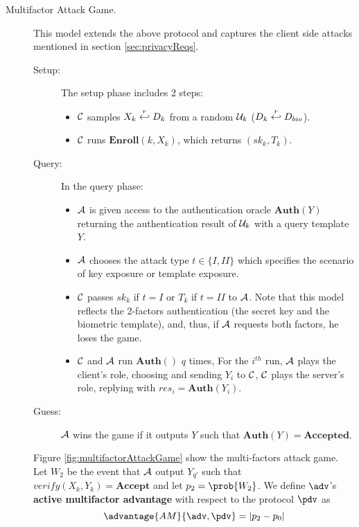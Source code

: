\begin{description}
\begin{description}
  \item[Multifactor Attack Game.] This model extends the above protocol and
    captures the client side attacks mentioned in section \ref{sec:privacyReqs}.
    \begin{description}
    \item[Setup:] The setup phase includes 2 steps:
      \begin{itemize}
      \item $\mathcal{C}$ samples $X_k \stackrel{r}{\hookleftarrow} D_{k}$ from a random
        $\mathcal{U}_k$ ($D_k \stackrel{r}{\hookleftarrow} D_{bio}$).
      \item $\mathcal{C}$ runs $\textbf{Enroll}(k, X_k)$, which returns $(sk_k, T_k)$.
      \end{itemize}
    \item[Query:] In the query phase:
      \begin{itemize}
      \item $\mathcal{A}$ is given access to the authentication oracle
        $\mathbf{Auth}(Y)$ returning the authentication result of $\mathcal{U}_k$ with
        a query template $Y$.
      \item $\mathcal{A}$ chooses the attack type $t \in \{I,II\}$ which specifies
        the scenario of key exposure or template exposure.

      \item $\mathcal{C}$ passes $sk_k$ if $t = I$ or $T_k$ if $t = II$ to
        $\mathcal{A}$. Note that this model reflects the 2-factors authentication
        (the secret key and the biometric template), and, thus, if $\mathcal{A}$
        requests both factors, he loses the game.
      \item $\mathcal{C}$ and $\mathcal{A}$ run $\mathbf{Auth()}$ $q$ times, For
        the $i^{th}$ run, $\mathcal{A}$ plays the client's role, choosing and
        sending $Y_i$ to $\mathcal{C}$, $\mathcal{C}$ plays the server's role,
        replying with $res_i = \mathbf{Auth}(Y_i)$.
      \end{itemize}
    \item[Guess:] $\mathcal{A}$ wins the game if it outputs $Y$ such that
      $\mathbf{Auth}(Y) = \textbf{Accepted}$.
    \end{description}
    
    Figure \ref{fig:multifactorAttackGame} show the multi-factors attack
    game. Let $W_{2}$ be the event that $\mathcal{A}$ output $Y_{q'}$ such that
    $verify(X_{k},Y_{k}) = \mathbf{Accept}$ and let $p_{2} = \prob{W_{2}} $. We
    define $\adv$'s \textbf{active multifactor advantage} with respect to the
    protocol $\pdv$ as
    \[
      \advantage{AM}{\adv,\pdv} = |p_{2} - p_{0}|
    \]
    

\end{description}
\end{description}
